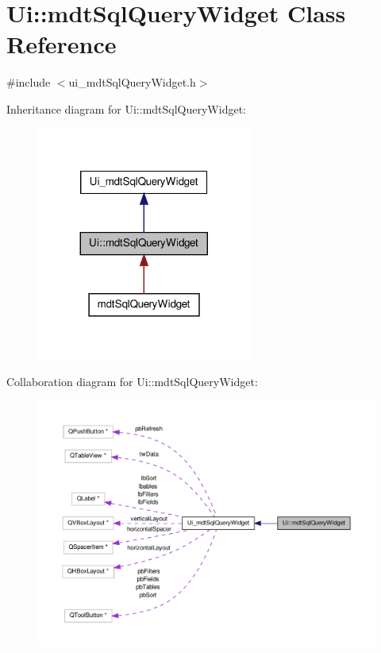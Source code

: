 \hypertarget{class_ui_1_1mdt_sql_query_widget}{\section{Ui\-:\-:mdt\-Sql\-Query\-Widget Class Reference}
\label{class_ui_1_1mdt_sql_query_widget}
}


{\ttfamily \#include $<$ui\-\_\-mdt\-Sql\-Query\-Widget.\-h$>$}



Inheritance diagram for Ui\-:\-:mdt\-Sql\-Query\-Widget\-:\nopagebreak
\begin{figure}[H]
\begin{center}
\leavevmode
\includegraphics[width=200pt]{class_ui_1_1mdt_sql_query_widget__inherit__graph}
\end{center}
\end{figure}


Collaboration diagram for Ui\-:\-:mdt\-Sql\-Query\-Widget\-:\nopagebreak
\begin{figure}[H]
\begin{center}
\leavevmode
\includegraphics[width=350pt]{class_ui_1_1mdt_sql_query_widget__coll__graph}
\end{center}
\end{figure}
